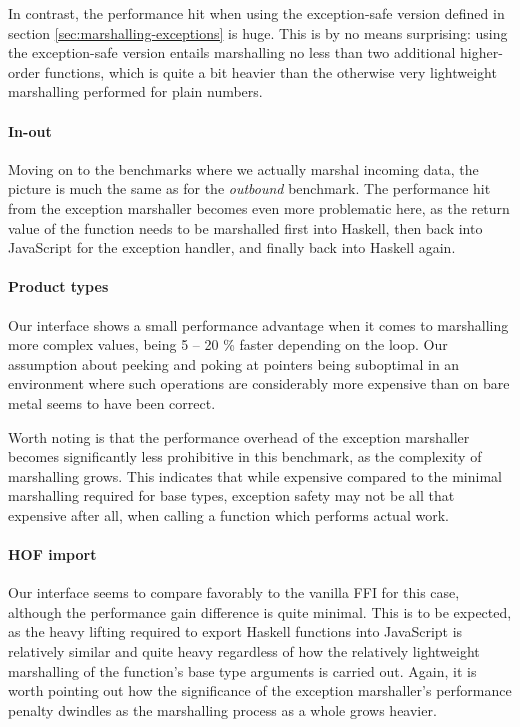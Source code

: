 \documentclass{sigplanconf}
\begin{document}
In contrast, the performance hit when using the exception-safe version defined
in section \ref{sec:marshalling-exceptions} is huge.
This is by no means surprising: using the exception-safe version entails
marshalling no less than two additional higher-order functions, which is quite
a bit heavier than the otherwise very lightweight marshalling performed for
plain numbers.

\paragraph{In-out}
Moving on to the benchmarks where we actually marshal incoming data, the
picture is much the same as for the \emph{outbound} benchmark. The performance
hit from the exception marshaller becomes even more problematic here, as the
return value of the function needs to be marshalled first into Haskell,
then back into JavaScript for the exception handler, and finally back into
Haskell again.

\paragraph{Product types}
Our interface shows a small performance advantage when it comes to
marshalling more complex values, being 5 -- 20 \% faster
depending on the loop. Our assumption about peeking and poking at pointers
being suboptimal in an environment where such operations are considerably
more expensive than on bare metal seems to have been correct.

Worth noting is that the performance overhead of the exception marshaller
becomes significantly less prohibitive in this benchmark, as the complexity
of marshalling grows. This indicates that while expensive compared to
the minimal marshalling required for base types, exception safety may not be
all that expensive after all, when calling a function which performs actual
work.

\paragraph{HOF import}
Our interface seems to compare favorably to the vanilla FFI for this case,
although the performance gain difference is quite minimal. This is to be
expected, as the heavy lifting required to export Haskell functions into
JavaScript is relatively similar and quite heavy regardless of how the
relatively lightweight marshalling of the function's base type arguments
is carried out. Again, it is worth pointing out how the significance of the
exception marshaller's performance penalty dwindles as the marshalling
process as a whole grows heavier.
\end{document}
